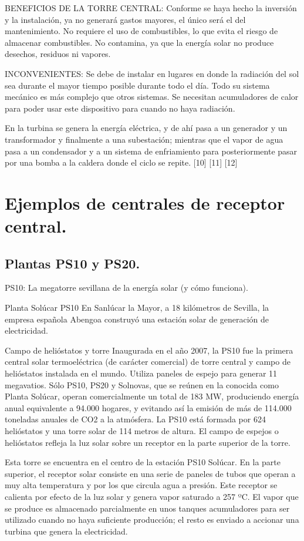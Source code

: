 \documentclass[12pt]{article}
\begin{document}
BENEFICIOS DE LA TORRE CENTRAL:
Conforme se haya hecho la inversión y la instalación, ya no generará gastos mayores, el único será el del mantenimiento.
No requiere el uso de combustibles, lo que evita el riesgo de almacenar combustibles.
No contamina, ya que la energía solar no produce desechos, residuos ni vapores.

INCONVENIENTES:
Se debe de instalar en lugares en donde la radiación del sol sea durante el mayor tiempo posible durante todo el día.
Todo su sistema mecánico es más complejo que otros sistemas.
Se necesitan acumuladores de calor para poder usar este dispositivo para cuando no haya radiación.

En la turbina se genera la energía eléctrica, y de ahí pasa a un generador y un transformador y finalmente a una subestación; mientras que el vapor de agua pasa a un condensador y a un sistema de enfriamiento para posteriormente pasar por una bomba a la caldera donde el ciclo se repite. [10] [11] [12]

\section{Ejemplos de centrales de receptor central.}
\subsection{Plantas PS10 y PS20.}

PS10: La megatorre sevillana de la energía solar (y cómo funciona).

Planta Solúcar PS10
En Sanlúcar la Mayor, a 18 kilómetros de Sevilla, la empresa española Abengoa construyó una estación solar de generación de electricidad.

Campo de helióstatos y torre
Inaugurada en el año 2007, la PS10 fue la primera central solar termoeléctrica (de carácter comercial) de torre central y campo de helióstatos instalada en el mundo. Utiliza paneles de espejo para generar 11 megavatios.
Sólo PS10, PS20 y Solnovas, que se reúnen en la conocida como Planta Solúcar, operan comercialmente un total de 183 MW, produciendo energía anual equivalente a 94.000 hogares, y evitando así la emisión de más de 114.000 toneladas anuales de CO2 a la atmósfera.
La PS10 está formada por 624 helióstatos y una torre solar de 114 metros de altura. El campo de espejos o helióstatos refleja la luz solar sobre un receptor en la parte superior de la torre.

Esta torre se encuentra en el centro de la estación PS10 Solúcar. En la parte superior, el receptor solar consiste en una serie de paneles de tubos que operan a muy alta temperatura y por los que circula agua a presión. Este receptor se calienta por efecto de la luz solar y genera vapor saturado a 257 ºC. El vapor que se produce es almacenado parcialmente en unos tanques acumuladores para ser utilizado cuando no haya suficiente producción; el resto es enviado a accionar una turbina que genera la electricidad.
\end{document}
